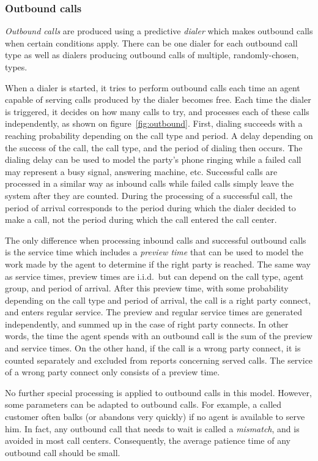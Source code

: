 \subsubsection{Outbound calls}

\emph{Outbound calls} are produced
using a predictive \emph{dialer}
which makes outbound calls when
certain conditions apply.  There can be one dialer for each outbound call
type as well as dialers producing outbound calls of multiple,
randomly-chosen, types.

When a dialer is started, it tries to perform outbound calls
each time an agent capable of serving calls produced by the
dialer becomes free.
Each time the dialer is triggered, it decides on how many calls to
try, and processes each of these calls independently,
as shown on
figure~\ref{fig:outbound}.
First, dialing succeeds with a reaching
probability depending on the call type and period.
A delay depending on the success of the call, the call type, and the
period of dialing then occurs.
The dialing delay can be used to model the party's phone ringing while
a failed call may represent a busy signal, answering machine, etc.
Successful calls are processed in a similar
way as inbound calls while failed calls simply leave the system after
they are counted.
During the processing of a successful call, the period of arrival
corresponds to the period during which the dialer decided to make a
call, not the period during which the call entered the call center.

The only difference when processing inbound calls and successful
outbound calls is
the service time which includes a \emph{preview time} that
can be used to model the work made by the agent to determine
if the right party is reached.
The same way as service times,
preview times are i.i.d.\ but can depend on the call type, agent
group,
and period of arrival.
After this preview time,
with some probability depending on the call type and period of
arrival, the call is a right party connect, and enters regular service.
The preview and regular service times are generated
independently, and summed up in the case of right party connects. In other words,
the time the agent spends with an outbound
call is the sum of the preview and service times.
On the other hand,
if the call is a wrong party connect, it is counted separately and
excluded from reports concerning served calls.
The service of a wrong party connect only consists of a preview time.

No further special processing is applied to outbound calls
in this model.  However, some parameters can
be adapted to outbound calls.
For example, a called customer often balks (or
abandons very quickly) if no agent is available to serve him.
In fact, any outbound call that needs to wait is called a
\emph{mismatch}, and
is avoided in most call centers.
Consequently, the average patience time of any outbound call should be
small.

